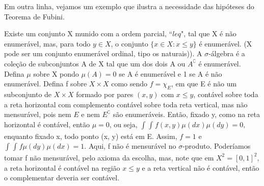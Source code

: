 \documentclass[measure_theory.tex]{subfiles}
\begin{document}
Em outra linha, vejamos um exemplo que ilustra a necessidade das hipóteses do Teorema de Fubini.
\begin{example}
	Existe um conjunto X munido com a ordem parcial, ``\(leq \)", tal que X é não enumerável, mas, para todo \(y\in X\), o conjunto \(\{x\in X: x \leq y\}\) é enumerável. (X pode ser um conjunto enumerável ordinal, tipo os naturais)).
	A \(\sigma \)-álgebra é a coleção de subconjuntos A de X tal que um dos dois A ou \(A ^{\complement}\) é enumerável. Defina \(\mu \) sobre X pondo \(\mu (A) = 0\) se A é enumerável e 1 se A é não enumerável. Defina f sobre \(X\times X\) como sendo
	\(f = \chi_{E}\), em que E é não um subconjunto de \(X\times X\) formado por pares \((x, y)\) com \(x\leq y\), contável sobre toda a reta horizontal com complemento contável sobre toda reta vertical, mas não mensurável, pois nem \(E \) e nem \(E ^{\complement}\) são enumeráveis.
	Então, fixado y, como na reta horizontal é contável, então \(\mu = 0\), ou seja, \(\int_{}^{}\int_{}^{}f(x, y)\mu (dx)\mu (dy) = 0, \) enquanto fixado x, todo ponto (x, y) está em E. Assim, \(f=1\) e \(\int_{}^{}\int_{}^{}f\mu (dy)\mu (dx) = 1.\)
	Aqui, f não é mensurável no \(\sigma \)-produto. Poderíamos tomar f não mensurável, pelo axioma da escolha, mas, note que em \(X^{2} = [0, 1]^{2},\) a reta horizontal é contável na região \(x\leq y\) e a reta vertical não é contável, então o complementar deveria ser contável.
\end{example}
\end{document}
